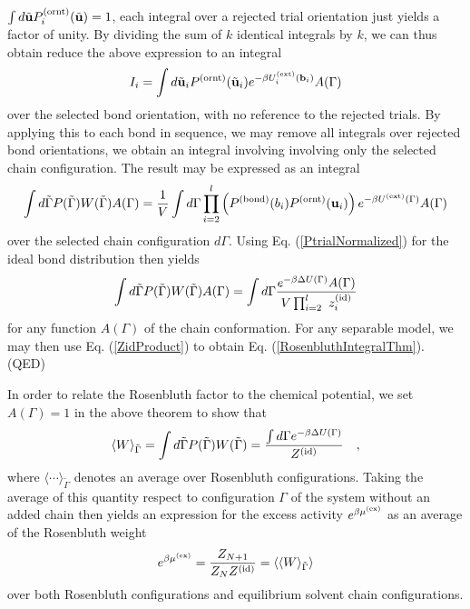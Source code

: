 \documentclass[12pt]{article} %
\newcommand{\vv}[1]{\mathbf{#1}}
\newcommand\chain{\Gamma}
\newcommand\delU{\Delta U}
\newcommand\Uext{U^{({\rm ext})}}
\newcommand\Ztot{Z_{N+1}}
\newcommand\Zsystem{Z_{N}}
\newcommand\Zid{Z^{({\rm id})}}
\newcommand\muex{\mu^{({\rm ex})}}
\newcommand\nbead{l}
\newcommand\vbond{\vv{b}}
\newcommand\ubond{\vv{u}}
\newcommand\rbond{b}
\newcommand\utrial{\tilde{\vv{u}}}
\newcommand\Pbond{P^{({\rm bond})}}
\newcommand\Pornt{P^{({\rm ornt})}}
\newcommand\zid{z^{({\rm id})}}
\newcommand\rconfig{\tilde{\chain}}
\begin{document}
$\int d\utrial \Pornt_{i}(\utrial) =1$, each integral over a rejected 
trial orientation just yields a factor of unity. By dividing the sum of 
$k$ identical integrals by $k$, we can thus obtain reduce the above
expression to an integral
\begin{equation}
   I_i = \int d\utrial_{i} \Pornt(\utrial_{i}) 
   e^{-\beta\Uext_{i}(\vbond_{i})} A(\chain) 
\end{equation}
over the selected bond orientation, with no reference to the rejected 
trials. By applying this to each bond in sequence, we may remove all 
integrals over rejected bond orientations, we obtain an integral 
involving involving only the selected chain configuration.  The result 
may be expressed as an integral
\begin{equation}
    \int d\rconfig P(\rconfig)W(\rconfig) A(\chain) = 
    \frac{1}{V} \int d\chain 
    \prod_{i=2}^{\nbead} \left ( \Pbond(\rbond_{i}) \Pornt(\ubond_{i}) \right )
    e^{-\beta\Uext(\chain)} A(\chain) 
\end{equation}
over the selected chain configuration $d\chain$. Using Eq. (\ref{PtrialNormalized}) for the ideal bond distribution then yields
\begin{equation}
    \int d\rconfig P(\rconfig)W(\rconfig) A(\chain) = 
    \int d\chain \frac{e^{-\beta\delU(\chain)}A(\chain)}{ V\prod_{i=2}^{\nbead}\     \zid_{i}}
\end{equation}
for any function $A(\chain)$ of the chain conformation. For any separable model,
we may then use Eq.  (\ref{ZidProduct}) to obtain Eq. (\ref{RosenbluthIntegralThm}).
(QED)

In order to relate the Rosenbluth factor to the chemical potential, we set $A(\chain)=1$
in the above theorem to show that
\begin{equation}
    \langle W \rangle_{\rconfig} = \int d\rconfig P(\rconfig)W(\rconfig) = 
    \frac{\int d\chain e^{-\beta\delU(\chain)}}{\Zid} 
    \quad,
\end{equation}
where $\langle \cdots \rangle_{\rconfig}$ denotes an average over Rosenbluth configurations.
Taking the average of this quantity respect to configuration $\chain$ of the system without 
an added chain then yields an expression for the excess activity $e^{\beta\muex}$ as an 
average of the Rosenbluth weight
\begin{equation}
   e^{\beta \muex} = 
   \frac{\Ztot}{\Zsystem\Zid} = 
   \langle \langle W \rangle_{\rconfig} \rangle
\end{equation}
over both Rosenbluth configurations and equilibrium solvent chain configurations. 
\end{document}
